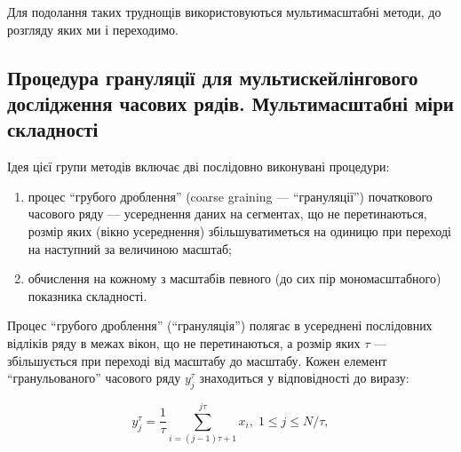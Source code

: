 \documentclass[
  letterpaper,
]{report}
\providecommand{\tightlist}{%
  \setlength{\itemsep}{0pt}\setlength{\parskip}{0pt}}\usepackage{longtable,booktabs,array}
\begin{document}
Для подолання таких труднощів використовуються мультимасштабні методи,
до розгляду яких ми і переходимо.

\hypertarget{ux43fux440ux43eux446ux435ux434ux443ux440ux430-ux433ux440ux430ux43dux443ux43bux44fux446ux456ux457-ux434ux43bux44f-ux43cux443ux43bux44cux442ux438ux441ux43aux435ux439ux43bux456ux43dux433ux43eux432ux43eux433ux43e-ux434ux43eux441ux43bux456ux434ux436ux435ux43dux43dux44f-ux447ux430ux441ux43eux432ux438ux445-ux440ux44fux434ux456ux432.-ux43cux443ux43bux44cux442ux438ux43cux430ux441ux448ux442ux430ux431ux43dux456-ux43cux456ux440ux438-ux441ux43aux43bux430ux434ux43dux43eux441ux442ux456}{%
\subsection{Процедура грануляції для мультискейлінгового дослідження
часових рядів. Мультимасштабні міри
складності}\label{ux43fux440ux43eux446ux435ux434ux443ux440ux430-ux433ux440ux430ux43dux443ux43bux44fux446ux456ux457-ux434ux43bux44f-ux43cux443ux43bux44cux442ux438ux441ux43aux435ux439ux43bux456ux43dux433ux43eux432ux43eux433ux43e-ux434ux43eux441ux43bux456ux434ux436ux435ux43dux43dux44f-ux447ux430ux441ux43eux432ux438ux445-ux440ux44fux434ux456ux432.-ux43cux443ux43bux44cux442ux438ux43cux430ux441ux448ux442ux430ux431ux43dux456-ux43cux456ux440ux438-ux441ux43aux43bux430ux434ux43dux43eux441ux442ux456}}

Ідея цієї групи методів включає дві послідовно виконувані процедури:

\begin{enumerate}
\def\labelenumi{\arabic{enumi}.}
\tightlist
\item
  процес ``грубого дроблення'' (coarse graining --- ``грануляції'')
  початкового часового ряду --- усереднення даних на сегментах, що не
  перетинаються, розмір яких (вікно усереднення) збільшуватиметься на
  одиницю при переході на наступний за величиною масштаб;
\item
  обчислення на кожному з масштабів певного (до сих пір мономасштабного)
  показника складності.
\end{enumerate}

Процес ``грубого дроблення'' (``грануляція'') полягає в усереднені
послідовних відліків ряду в межах вікон, що не перетинаються, а розмір
яких \(\tau\) --- збільшується при переході від масштабу до масштабу.
Кожен елемент ``гранульованого'' часового ряду \(y_{j}^{\tau}\)
знаходиться у відповідності до виразу:

\[
y_{j}^{\tau} = \frac{1}{\tau}\sum_{i=(j-1)\tau+1}^{j\tau}x_i, \; 1 \leq j \leq N/\tau,
\]
\end{document}
